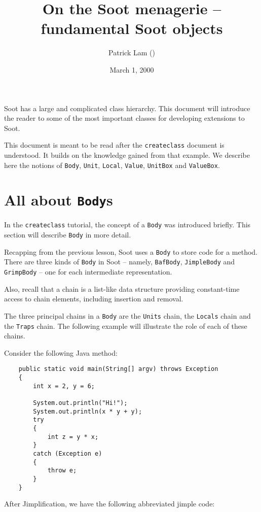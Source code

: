 \documentclass{article}
\author{Patrick Lam (\htmladdnormallink{plam@sable.mcgill.ca}{mailto:plam@sable.mcgill.ca})}
\title{On the Soot menagerie -- fundamental Soot objects}
\date{March 1, 2000}
\begin{document}
\maketitle

Soot has a large and complicated class hierarchy.  This document will
introduce the reader to some of the most important classes for developing
extensions to Soot.

This document is meant to be read after the {\tt createclass} document 
is understood.  It builds on the knowledge gained from that example.
We describe here the notions of {\tt Body}, {\tt Unit}, {\tt Local}, {\tt Value},
{\tt UnitBox} and {\tt ValueBox}.

\section{All about {\tt Body}s}

In the {\tt createclass} tutorial, the concept of a {\tt Body} was introduced
briefly.  This section will describe {\tt Body} in more detail.

Recapping from the previous lesson, Soot uses a {\tt Body} to store code
for a method.  There are three kinds of {\tt Body} in Soot -- namely, 
{\tt BafBody}, {\tt JimpleBody} and {\tt GrimpBody} -- one for each 
intermediate representation.

Also, recall that a chain is a list-like data structure providing constant-time
access to chain elements, including insertion and removal.

The three principal chains in a {\tt Body} are the {\tt Units} chain, the
{\tt Locals} chain and the {\tt Traps} chain.  The following example will
illustrate the role of each of these chains.

Consider the following Java method:

\begin{verbatim}
    public static void main(String[] argv) throws Exception
    {
        int x = 2, y = 6;

        System.out.println("Hi!");
        System.out.println(x * y + y);
        try
        {
            int z = y * x;
        }
        catch (Exception e)
        {
            throw e;
        }
    }
\end{verbatim}

After Jimplification, we have the following abbreviated jimple code:
\end{document}
